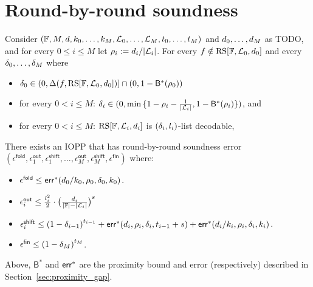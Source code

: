 \section{Round-by-round soundness}\label{sec:rnd_by_rnd_soundness}
\begin{lemma}\label{lemma:rnd_by_rnd_soundness}
    Consider $(\mathbb{F},M,d,k_0,\ldots,k_M,\mathcal{L}_0,\ldots,\mathcal{L}_M,t_0,\ldots,t_M)$ and $d_0,\ldots,d_M$ as TODO, and for every $0\leq i\leq M$ let $\rho_i:=d_i/|\mathcal{L}_i|$. For every $f\notin\mathrm{RS}[\mathbb{F},\mathcal{L}_0,d_0]$ and every $\delta_0,\ldots,\delta_M$ where
    \begin{itemize}
        \item $\delta_0\in(0,\Delta(f,\mathrm{RS}[\mathbb{F},\mathcal{L}_0,d_0])]\cap(0,1-{\mathsf{B}}^*(\rho_0))$
        \item for every $0<i\leq M$: $\delta_i\in(0,\min{\{1-\rho_i-\frac{1}{|\mathcal{L}_i|},1-{\mathsf{B}^*(\rho_i)}\}})$, and
        \item for every $0<i\leq M$: $\mathrm{RS}[\mathbb{F},\mathcal{L}_i,d_i]$ is $(\delta_i,l_i)$-list decodable,
    \end{itemize}
    There exists an IOPP that has round-by-round soundness error $(\epsilon^{\mathsf{fold}},\epsilon^{\mathsf{out}}_1,\epsilon^{\mathsf{shift}}_1,\ldots,\epsilon^{\mathsf{out}}_M,\epsilon^{\mathsf{shift}}_M,\epsilon^{\mathsf{fin}})$ where:
    \begin{itemize}
        \item $\epsilon^{\mathsf{fold}}\leq\mathsf{err}^*(d_0/k_0,\rho_0,\delta_0,k_0)$.
        \item $\epsilon^{\mathsf{out}}_i\leq\frac{l^2_i}{2}\cdot{\big(\frac{d_i}{|\mathbb{F}|-|\mathcal{L}_i|}\big)}^s$
        \item $\epsilon^{\mathsf{shift}}_i\leq {(1-\delta_{i-1})}^{t_{i-1}}+\mathsf{err}^*(d_i,\rho_i,\delta_i,t_{i-1}+s)+\mathsf{err}^*(d_i/k_i,\rho_i,\delta_i,k_i)$.
        \item $\epsilon^{\mathsf{fin}}\leq{(1-\delta_M)}^{t_M}$.
    \end{itemize}
    Above, ${\mathsf{B}}^*$ and ${\mathsf{err}}^*$ are the proximity bound and error (respectively) described in Section~\ref{sec:proximity_gap}.
\end{lemma}